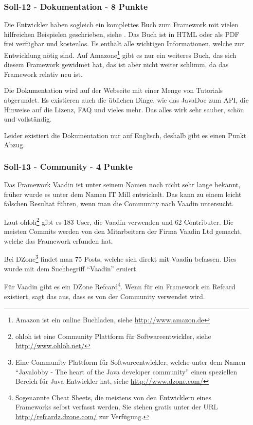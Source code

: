   \subsubsection{Soll-12 - Dokumentation - 8 Punkte}
  
  Die Entwickler haben sogleich ein komplettes Buch zum Framework mit vielen
  hilfreichen Beispielen geschrieben, siehe \cite{BookOfVaadin}. Das Buch ist
  in \ac{HTML} oder als \ac{PDF} frei verfügbar und kostenlos. Es enthält alle
  wichtigen Informationen, welche zur Entwicklung nötig sind. Auf
  Amazone\footnote{Amazon ist ein online Buchladen, siehe
  \url{http://www.amazon.de}} gibt es nur ein weiteres Buch, das sich diesem
  Framework gewidmet hat, das ist aber nicht weiter schlimm, da das Framework
  relativ neu ist.
  
  Die Dokumentation wird auf der Webseite mit einer Menge von Tutorials
  abgerundet. Es existieren auch die üblichen Dinge, wie das JavaDoc zum
  \ac{API}, die Hinweise auf die Lizenz, \ac{FAQ} und vieles mehr. Das alles
  wirk sehr sauber, schön und vollständig.
  
  Leider existiert die Dokumentation nur auf Englisch, deshalb gibt es einen
  Punkt Abzug.
  
  \subsubsection{Soll-13 - Community - 4 Punkte}
  
  Das Framework Vaadin ist unter seinem Namen noch nicht sehr lange bekannt,
  früher wurde es unter dem Namen IT Mill entwickelt. Das kann zu einem leicht
  falschen Resultat führen, wenn man die Community nach Vaadin untersucht.
  
  Laut ohloh\footnote{ohloh ist eine Community Plattform für
  Softwareentwickler, siehe \url{http://www.ohloh.net/}} gibt es 183 User, die
  Vaadin verwenden und 62 Contributer. Die meisten Commits werden von den
  Mitarbeitern der Firma Vaadin Ltd gemacht, welche das Framework
  erfunden hat.
  
  Bei DZone\footnote{Eine Community Plattform für Softwareentwickler, welche
  unter dem Namen ``Javalobby - The heart of the Java developer community''
  einen speziellen Bereich für Java Entwickler hat, siehe
  \url{http://www.dzone.com/}} findet man 75 Posts, welche sich direkt mit
  Vaadin befassen. Dies wurde mit dem Suchbegriff ``Vaadin'' eruiert.
  
  Für Vaadin gibt es ein DZone Refcard\footnote{Sogenannte Cheat Sheets, die
  meistens von den Entwicklern eines Frameworks selbst verfasst werden. Sie
  stehen gratis unter der \ac{URL} \url{http://refcardz.dzone.com/} zur
  Verfügung.}. Wenn für ein Framework ein Refcard existiert, sagt das aus, dass
  es von der Community verwendet wird.
  
